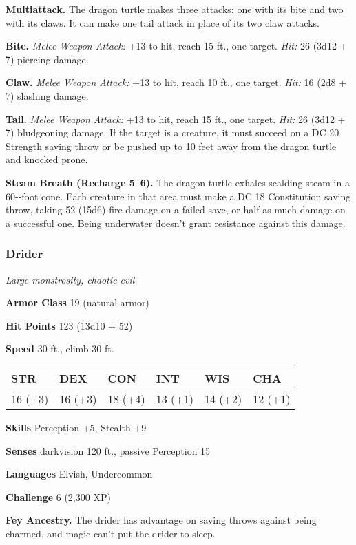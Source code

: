 \documentclass[
]{article}
\begin{document}
\textbf{Multiattack.} The dragon turtle makes three attacks: one with
its bite and two with its claws. It can make one tail attack in place of
its two claw attacks.

\textbf{Bite.} \emph{Melee Weapon Attack:} +13 to hit, reach 15 ft., one
target. \emph{Hit:} 26 (3d12 + 7) piercing damage.

\textbf{Claw.} \emph{Melee Weapon Attack:} +13 to hit, reach 10 ft., one
target. \emph{Hit:} 16 (2d8 + 7) slashing damage.

\textbf{Tail.} \emph{Melee Weapon Attack:} +13 to hit, reach 15 ft., one
target. \emph{Hit:} 26 (3d12 + 7) bludgeoning damage. If the target is a
creature, it must succeed on a DC 20 Strength saving throw or be pushed
up to 10 feet away from the dragon turtle and knocked prone.

\textbf{Steam Breath (Recharge 5--6).} The dragon turtle exhales
scalding steam in a 60-­‐foot cone. Each creature in that area must make
a DC 18 Constitution saving throw, taking 52 (15d6) fire damage on a
failed save, or half as much damage on a successful one. Being
underwater doesn't grant resistance against this damage.

\hypertarget{drider}{%
\subsubsection{Drider}\label{drider}}

\emph{Large monstrosity, chaotic evil}

\textbf{Armor Class} 19 (natural armor)

\textbf{Hit Points} 123 (13d10 + 52)

\textbf{Speed} 30 ft., climb 30 ft.

\begin{longtable}[]{@{}llllll@{}}
\toprule
STR & DEX & CON & INT & WIS & CHA\tabularnewline
\midrule
\endhead
16 (+3) & 16 (+3) & 18 (+4) & 13 (+1) & 14 (+2) & 12 (+1)\tabularnewline
\bottomrule
\end{longtable}

\textbf{Skills} Perception +5, Stealth +9

\textbf{Senses} darkvision 120 ft., passive Perception 15

\textbf{Languages} Elvish, Undercommon

\textbf{Challenge} 6 (2,300 XP)

\textbf{Fey Ancestry.} The drider has advantage on saving throws against
being charmed, and magic can't put the drider to sleep.
\end{document}
